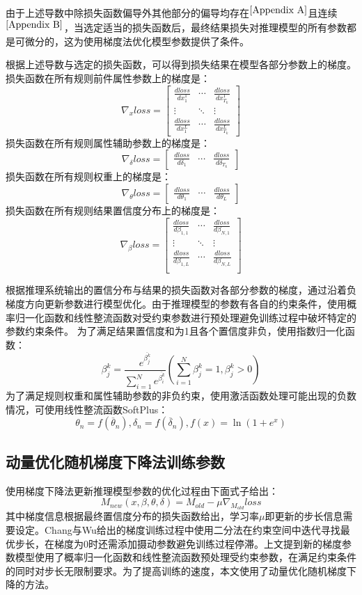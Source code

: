 \documentclass{cjc}
\begin{document}
由于上述导数中除损失函数偏导外其他部分的偏导均存在$^{\ref{Appendix A}}$且连续$^{\ref{Appendix B}}$，当选定适当的损失函数后，最终结果损失对推理模型的所有参数都是可微分的，这为使用梯度法优化模型参数提供了条件。

根据上述导数与选定的损失函数，可以得到损失结果在模型各部分参数上的梯度。
损失函数在所有规则前件属性参数上的梯度是：
$$\nabla_{x}loss=\left[\begin{matrix}
\frac{dloss}{dx_1^1} & \cdots & \frac{dloss}{dx_{T_k}^1}\\
\vdots & \ddots & \vdots \\
\frac{dloss}{dx_1^L}  & \cdots & \frac{dloss}{dx_{T_k}^L}
\end{matrix}\right]$$
损失函数在所有规则属性辅助参数上的梯度是：
$$\nabla_{\delta}loss=\left[\begin{matrix}
\frac{dloss}{d\delta_1} & \cdots & \frac{dloss}{d\delta_{T_k}}
\end{matrix}\right]$$
损失函数在所有规则权重上的梯度是：
$$\nabla_{\theta}loss=\left[\begin{matrix}
\frac{dloss}{d\theta_1} & \cdots & \frac{dloss}{d\theta_L}
\end{matrix}\right]$$
损失函数在所有规则结果置信度分布上的梯度是：
$$\nabla_{\beta}loss=\left[\begin{matrix}
\frac{dloss}{d\beta_{1,1}} & \cdots &  \frac{dloss}{d\beta_{N,1}}\\
\vdots & \ddots & \vdots\\
\frac{dloss}{d\beta_{1,L}} & \cdots &  \frac{dloss}{d\beta_{N,L}}\\
\end{matrix}\right]$$

根据推理系统输出的置信分布与结果的损失函数对各部分参数的梯度，通过沿着负梯度方向更新参数进行模型优化。由于推理模型的参数有各自的约束条件，使用概率归一化函数和线性整流函数对受约束参数进行预处理避免训练过程中破坏特定的参数约束条件。  
为了满足结果置信度和为1且各个置信度非负，使用指数归一化函数：
$$\beta_j^k=\frac{e^{\overline{\beta_j^k}}}{\sum_{i=1}^Ne^{\overline{\beta_i^k}}}(\sum_{i=1}^N\beta_j^k=1,\beta_j^k>0)$$
为了满足规则权重和属性辅助参数的非负约束，使用激活函数处理可能出现的负数情况，可使用线性整流函数SoftPlus：
$$\theta_n=f(\overline{\theta}_n),\delta_n=f(\overline{\delta}_n),f(x)=\ln(1+e^x)$$
\subsection{动量优化随机梯度下降法训练参数}
使用梯度下降法更新推理模型参数的优化过程由下面式子给出：
$$M_{new}(x,\beta,\theta,\delta)=M_{old}-\mu\nabla_{M_{old}}loss$$
其中梯度信息根据最终置信度分布的损失函数给出，学习率$\mu$即更新的步长信息需要设定。Chang\cite{a10}与Wu\cite{a12}给出的梯度训练过程中使用二分法在约束空间中迭代寻找最优步长，在梯度为0时还需添加摄动参数避免训练过程停滞。上文提到新的梯度参数模型使用了概率归一化函数和线性整流函数预处理受约束参数，在满足约束条件的同时对步长无限制要求。为了提高训练的速度，本文使用了动量优化随机梯度下降的方法。
\end{document}
